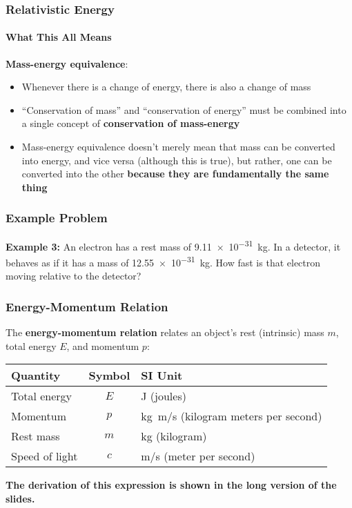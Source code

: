 \documentclass[12pt,compress,aspectratio=169]{beamer}
\newcommand{\eq}[2]{\vspace{#1}{\Large\begin{displaymath}#2\end{displaymath}}}
\begin{document}
\begin{frame}
  \frametitle{Relativistic Energy}
  \framesubtitle{What This All Means}
  
  \eq{-.2in}{
    \boxed{E=mc^2}
  }

  \textbf{Mass-energy equivalence}:
  \begin{itemize}
  \item Whenever there is a change of energy, there is also a change of mass
  \item ``Conservation of mass'' and ``conservation of energy'' must be
    combined into a single concept of \textbf{conservation of mass-energy}
  \item Mass-energy equivalence doesn't merely mean that mass can be converted
    into energy, and vice versa (although this is true), but rather, one can be
    converted into the other
    \textbf{because they are fundamentally the same thing}
  \end{itemize}
\end{frame}



\begin{frame}
  \frametitle{Example Problem}
  \textbf{Example 3:} An electron has a rest mass of \SI{9.11e-31}{\kilo\gram}.
  In a detector, it behaves as if it has a mass of \SI{12.55e-31}{\kilo\gram}.
  How fast is that electron moving relative to the detector?
\end{frame}


\begin{frame}
  \frametitle{Energy-Momentum Relation}
  The \textbf{energy-momentum relation} relates an object's rest (intrinsic)
  mass $m$, total energy $E$, and momentum $p$:

  \eq{-.2in}{
    \boxed{E^2=p^2c^2+m^2c^4}
  }
  \begin{center}
    \begin{tabular}{l|c|l}
      \rowcolor{pink}
      \textbf{Quantity} & \textbf{Symbol} & \textbf{SI Unit} \\ \hline
      Total energy   & $E$ & \si{\joule} (joules) \\
      Momentum       & $p$ & \si{\kilo\gram\metre/\second}
      (kilogram meters per second) \\
      Rest mass      & $m$ & \si{\kilo\gram} (kilogram)\\
      Speed of light & $c$ & \si{\metre/\second} (meter per second)
    \end{tabular}
  \end{center}

  \textbf{The derivation of this expression is shown in the long version of the
  slides.}
\end{frame}
\end{document}
